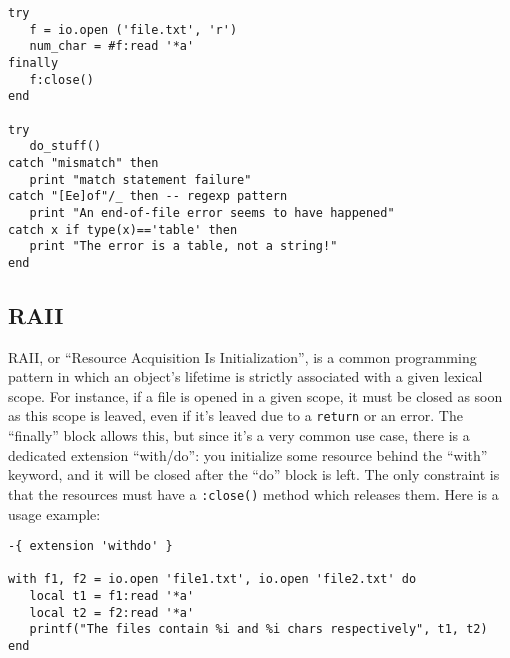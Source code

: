 \begin{verbatim}
try
   f = io.open ('file.txt', 'r')
   num_char = #f:read '*a'
finally
   f:close()
end

try
   do_stuff()
catch "mismatch" then
   print "match statement failure"
catch "[Ee]of"/_ then -- regexp pattern
   print "An end-of-file error seems to have happened"
catch x if type(x)=='table' then
   print "The error is a table, not a string!"
end
\end{verbatim}

 \subsection{RAII}
 RAII, or ``Resource Acquisition Is Initialization'', is a common
 programming pattern in which an object's lifetime is strictly
 associated with a given lexical scope. For instance, if a file is
 opened in a given scope, it must be closed as soon as this scope is
 leaved, even if it's leaved due to a {\tt return} or an error. The
 ``finally'' block allows this, but since it's a very common use case,
 there is a dedicated extension ``with/do'': you initialize some resource
 behind the ``with'' keyword, and it will be closed after the ``do''
 block is left. The only constraint is that the resources must have a
 {\tt:close()} method which releases them. Here is a usage example:

\begin{verbatim}
-{ extension 'withdo' }

with f1, f2 = io.open 'file1.txt', io.open 'file2.txt' do
   local t1 = f1:read '*a'
   local t2 = f2:read '*a'
   printf("The files contain %i and %i chars respectively", t1, t2)
end
\end{verbatim}

